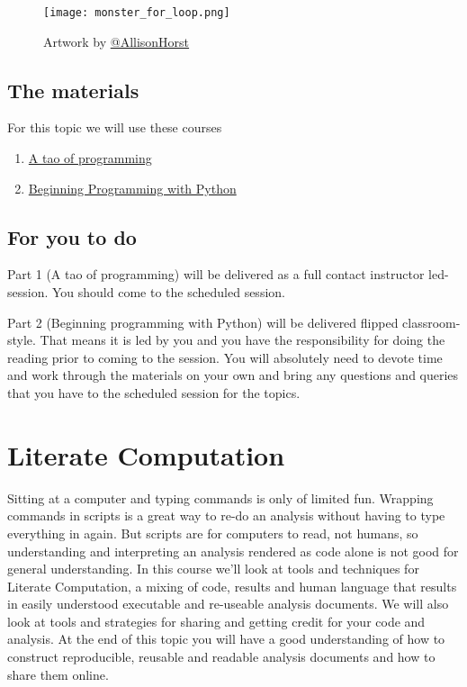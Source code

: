\documentclass[
]{book}
\providecommand{\tightlist}{%
  \setlength{\itemsep}{0pt}\setlength{\parskip}{0pt}}
\begin{document}
\begin{figure}
\centering
\texttt{[image: monster\_for\_loop.png]}
\caption{\label{fig:unnamed-chunk-6}Artwork by \href{https://github.com/allisonhorst}{@AllisonHorst}}
\end{figure}

\hypertarget{the-materials-5}{%
\section{The materials}\label{the-materials-5}}

For this topic we will use these courses

\begin{enumerate}
\def\labelenumi{\arabic{enumi}.}
\tightlist
\item
  \href{https://danmaclean.github.io/tao_of_programming/}{A tao of programming}
\item
  \href{https://danmaclean.github.io/programming_with_python/}{Beginning Programming with Python}
\end{enumerate}

\hypertarget{for-you-to-do-5}{%
\section{For you to do}\label{for-you-to-do-5}}

Part 1 (A tao of programming) will be delivered as a full contact instructor led-session. You should come to the scheduled session.

Part 2 (Beginning programming with Python) will be delivered flipped classroom-style. That means it is led by you and you have the responsibility for doing the reading prior to coming to the session. You will absolutely need to devote time and work through the materials on your own and bring any questions and queries that you have to the scheduled session for the topics.

\hypertarget{literate-computation}{%
\chapter{Literate Computation}\label{literate-computation}}

Sitting at a computer and typing commands is only of limited fun. Wrapping commands in scripts is a great way to re-do an analysis without having to type everything in again. But scripts are for computers to read, not humans, so understanding and interpreting an analysis rendered as code alone is not good for general understanding. In this course we'll look at tools and techniques for Literate Computation, a mixing of code, results and human language that results in easily understood executable and re-useable analysis documents. We will also look at tools and strategies for sharing and getting credit for your code and analysis. At the end of this topic you will have a good understanding of how to construct reproducible, reusable and readable analysis documents and how to share them online.
\end{document}
